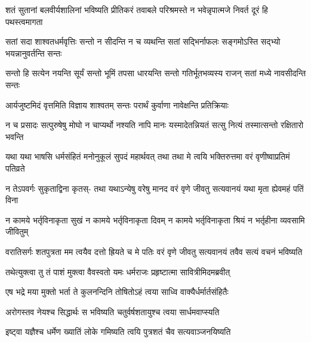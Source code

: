 

\fourlineindentedshloka
{शतं सुतानां बलवीर्यशालिनां}
{भविष्यति प्रीतिकरं तवाबले}
{परिश्रमस्ते न भवेन्नृपात्मजे}
{निवर्त दूरं हि पथस्त्वमागता}




\fourlineindentedshloka
{सतां सदा शाश्वतधर्मवृत्तिः}
{सन्तो न सीदन्ति न च व्यथन्ति}
{सतां सद्भिर्नाफलः सङ्गमोऽस्ति}
{सद्भ्यो भयन्नानुवर्तन्ति सन्तः}


\fourlineindentedshloka
{सन्तो हि सत्येन नयन्ति सूर्यं}
{सन्तो भूमिं तपसा धारयन्ति}
{सन्तो गतिर्भूतभव्यस्य राजन्}
{सतां मध्ये नावसीदन्ति सन्तः}


\twolineshloka
{आर्यजुष्टमिदं वृत्तमिति विज्ञाय शाश्वतम्}
{सन्तः परार्थं कुर्वाणा नावेक्षन्ति प्रतिक्रियाः}


\fourlineindentedshloka
{न च प्रसादः सत्पुरुषेषु मोघो}
{न चाप्यर्थो नश्यति नापि मानः}
{यस्मादेतन्नियतं सत्सु नित्यं}
{तस्मात्सन्तो रक्षितारो भवन्ति}



\fourlineindentedshloka
{यथा यथा भाषसि धर्मसंहितं}
{मनोनुकूलं सुपदं महार्थवत्}
{तथा तथा मे त्वयि भक्तिरुत्तमा}
{वरं वृणीष्वाप्रतिमं पतिव्रते}




\fourlineindentedshloka
{न तेऽपवर्गः सुकृताद्विना कृतस्-}
{तथा यथाऽन्येषु वरेषु मानद}
{वरं वृणे जीवतु सत्यवानयं}
{यथा मृता ह्येवमहं पतिं विना}


\fourlineindentedshloka
{न कामये भर्तृविनाकृता सुखं}
{न कामये भर्तृविनाकृता दिवम्}
{न कामये भर्तृविनाकृता श्रियं}
{न भर्तृहीना व्यवसामि जीवितुम्}


\fourlineindentedshloka
{वरातिसर्गः शतपुत्रता मम}
{त्वयैव दत्तो ह्रियते च मे पतिः}
{वरं वृणे जीवतु सत्यवानयं}
{तवैव सत्यं वचनं भविष्यति}




\twolineshloka
{तथेत्युक्त्वा तु तं पाशं मुक्त्वा वैवस्वतो यमः}
{धर्मराजः प्रहृष्टात्मा सावित्रीमिदमब्रवीत्}


\twolineshloka
{एष भद्रे मया मुक्तो भर्ता ते कुलनन्दिनि}
{तोषितोऽहं त्वया साध्वि वाक्यैर्धर्मार्तसंहितैः}


\twolineshloka
{अरोगस्तव नेयश्च सिद्धार्थः स भविष्यति}
{चतुर्वर्षशतायुश्च त्वया सार्धमवाप्स्यति}


\twolineshloka
{इष्ट्वा यज्ञैश्च धर्मेण ख्यातिं लोके गमिष्यति}
{त्वयि पुत्रशतं चैव सत्यवाञ्जनयिष्यति}


